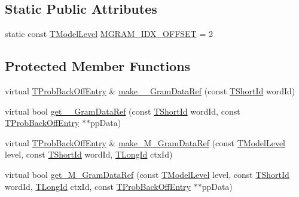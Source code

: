 \subsection*{Static Public Attributes}
\begin{DoxyCompactItemize}
\item 
static const \hyperlink{namespaceuva_1_1smt_1_1tries_a20577a44b3a42d26524250634379b7cb}{T\+Model\+Level} \hyperlink{classuva_1_1smt_1_1tries_1_1_c2_d_hybrid_trie_aae334ae9035f1260c174cebfcd80d941}{M\+G\+R\+A\+M\+\_\+\+I\+D\+X\+\_\+\+O\+F\+F\+S\+E\+T} = 2
\end{DoxyCompactItemize}
\subsection*{Protected Member Functions}
\begin{DoxyCompactItemize}
\item 
virtual \hyperlink{structuva_1_1smt_1_1tries_1_1_t_prob_back_off_entry}{T\+Prob\+Back\+Off\+Entry} \& \hyperlink{classuva_1_1smt_1_1tries_1_1_c2_d_hybrid_trie_a4d636c29da6764b69dc7e8c2450611ff}{make\+\_\+\_\+\+Gram\+Data\+Ref} (const \hyperlink{namespaceuva_1_1smt_1_1hashing_adcf22e1982ad09d3a63494c006267469}{T\+Short\+Id} word\+Id)
\item 
virtual bool \hyperlink{classuva_1_1smt_1_1tries_1_1_c2_d_hybrid_trie_a5a7d07fea0425e5d12099b62ba59994d}{get\+\_\+\_\+\+Gram\+Data\+Ref} (const \hyperlink{namespaceuva_1_1smt_1_1hashing_adcf22e1982ad09d3a63494c006267469}{T\+Short\+Id} word\+Id, const \hyperlink{structuva_1_1smt_1_1tries_1_1_t_prob_back_off_entry}{T\+Prob\+Back\+Off\+Entry} $\ast$$\ast$pp\+Data)
\item 
virtual \hyperlink{structuva_1_1smt_1_1tries_1_1_t_prob_back_off_entry}{T\+Prob\+Back\+Off\+Entry} \& \hyperlink{classuva_1_1smt_1_1tries_1_1_c2_d_hybrid_trie_ae9c841565bd4ddc5da6b90470af0aa7f}{make\+\_\+\+M\+\_\+\+Gram\+Data\+Ref} (const \hyperlink{namespaceuva_1_1smt_1_1tries_a20577a44b3a42d26524250634379b7cb}{T\+Model\+Level} level, const \hyperlink{namespaceuva_1_1smt_1_1hashing_adcf22e1982ad09d3a63494c006267469}{T\+Short\+Id} word\+Id, \hyperlink{namespaceuva_1_1smt_1_1hashing_a5992ac0dea0fb3226fb403ede09fad55}{T\+Long\+Id} ctx\+Id)
\item 
virtual bool \hyperlink{classuva_1_1smt_1_1tries_1_1_c2_d_hybrid_trie_abe96f7887eced0f64f4b78d575107831}{get\+\_\+\+M\+\_\+\+Gram\+Data\+Ref} (const \hyperlink{namespaceuva_1_1smt_1_1tries_a20577a44b3a42d26524250634379b7cb}{T\+Model\+Level} level, const \hyperlink{namespaceuva_1_1smt_1_1hashing_adcf22e1982ad09d3a63494c006267469}{T\+Short\+Id} word\+Id, \hyperlink{namespaceuva_1_1smt_1_1hashing_a5992ac0dea0fb3226fb403ede09fad55}{T\+Long\+Id} ctx\+Id, const \hyperlink{structuva_1_1smt_1_1tries_1_1_t_prob_back_off_entry}{T\+Prob\+Back\+Off\+Entry} $\ast$$\ast$pp\+Data)

\end{DoxyCompactItemize}
